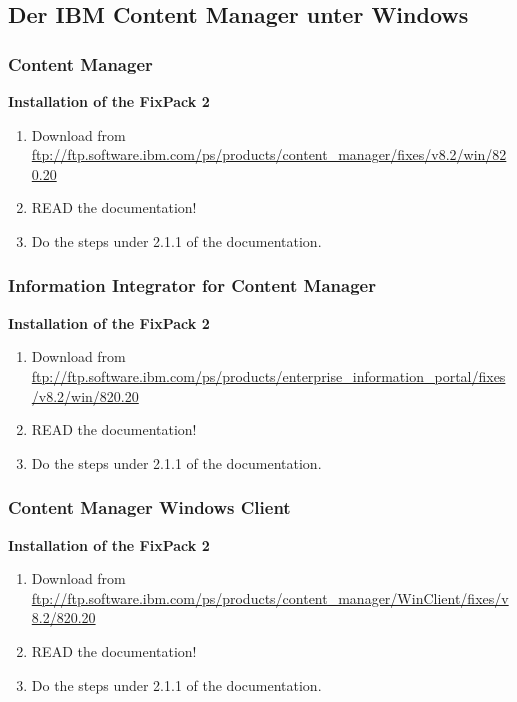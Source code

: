 %
%
\subsection{Der IBM Content Manager unter Windows}
%
\subsubsection{Content Manager}
%
{\bf Installation of the FixPack 2}
\begin{enumerate}
\item Download from \url{ftp://ftp.software.ibm.com/ps/products/content_manager/fixes/v8.2/win/820.20}
\item READ the documentation!
\item Do the steps under 2.1.1 of the documentation.
\end{enumerate}

%
\subsubsection{Information Integrator for Content Manager}
%
{\bf Installation of the FixPack 2}
\begin{enumerate}
\item Download from \url{ftp://ftp.software.ibm.com/ps/products/enterprise_information_portal/fixes/v8.2/win/820.20}
\item READ the documentation!
\item Do the steps under 2.1.1 of the documentation.
\end{enumerate}

%
\subsubsection{Content Manager Windows Client}
%
{\bf Installation of the FixPack 2}
\begin{enumerate}
\item Download from \url{ftp://ftp.software.ibm.com/ps/products/content_manager/WinClient/fixes/v8.2/820.20}
\item READ the documentation!
\item Do the steps under 2.1.1 of the documentation.
\end{enumerate}

